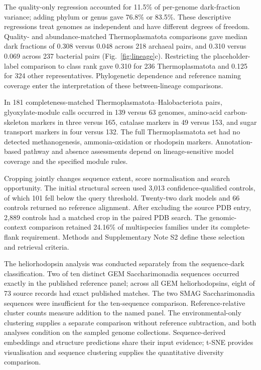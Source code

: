 The quality-only regression accounted for 11.5\% of per-genome dark-fraction variance; adding phylum or genus gave 76.8\% or 83.5\%. These descriptive regressions treat genomes as independent and have different degrees of freedom. Quality- and abundance-matched Thermoplasmatota comparisons gave median dark fractions of 0.308 versus 0.048 across 218 archaeal pairs, and 0.310 versus 0.069 across 237 bacterial pairs (Fig.~\ref{fig:lineage}c). Restricting the placeholder-label comparison to class rank gave 0.310 for 236 Thermoplasmatota and 0.125 for 324 other representatives. Phylogenetic dependence and reference naming coverage enter the interpretation of these between-lineage comparisons.

In 181 completeness-matched Thermoplasmatota--Halobacteriota pairs, glyoxylate-module calls occurred in 139 versus 63 genomes, amino-acid carbon-skeleton markers in three versus 165, catalase markers in 49 versus 153, and sugar transport markers in four versus 132. The full Thermoplasmatota set had no detected methanogenesis, ammonia-oxidation or rhodopsin markers. Annotation-based pathway and absence assessments depend on lineage-sensitive model coverage and the specified module rules.

Cropping jointly changes sequence extent, score normalisation and search opportunity. The initial structural screen used 3{,}013 confidence-qualified controls, of which 101 fell below the query threshold. Twenty-two dark models and 66 controls returned no reference alignment. After excluding the source PDB entry, 2{,}889 controls had a matched crop in the paired PDB search. The genomic-context comparison retained 24.16\% of multispecies families under its complete-flank requirement. Methods and Supplementary Note S2 define these selection and retrieval criteria.

The heliorhodopsin analysis was conducted separately from the sequence-dark classification. Two of ten distinct GEM Saccharimonadia sequences occurred exactly in the published reference panel; across all GEM heliorhodopsins, eight of 73 source records had exact published matches. The two SMAG Saccharimonadia sequences were insufficient for the ten-sequence comparison. Reference-relative cluster counts measure addition to the named panel. The environmental-only clustering supplies a separate comparison without reference subtraction, and both analyses condition on the sampled genome collections. Sequence-derived embeddings and structure predictions share their input evidence; t-SNE provides visualisation and sequence clustering supplies the quantitative diversity comparison.

